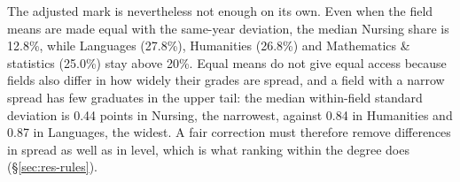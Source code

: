 The adjusted mark is nevertheless not enough on its own. Even when the field means are made equal with the same-year deviation, the median Nursing share is 12.8\%, while Languages (27.8\%), Humanities (26.8\%) and Mathematics \& statistics (25.0\%) stay above 20\%. Equal means do not give equal access because fields also differ in how widely their grades are spread, and a field with a narrow spread has few graduates in the upper tail: the median within-field standard deviation is 0.44 points in Nursing, the narrowest, against 0.84 in Humanities and 0.87 in Languages, the widest. A fair correction must therefore remove differences in spread as well as in level, which is what ranking within the degree does (\S\ref{sec:res-rules}).
